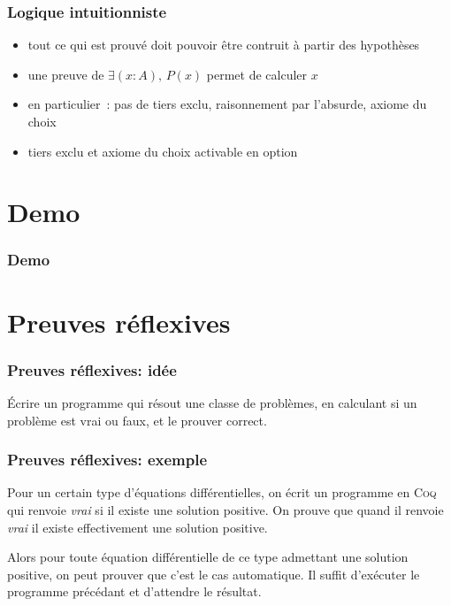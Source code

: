 \documentclass[hyperref={pdfpagelabels=false}]{beamer}
\begin{document}
\begin{frame}
  \frametitle{Logique intuitionniste}
  \begin{itemize}
    \item tout ce qui est prouvé doit pouvoir être contruit à partir des hypothèses
    \item une preuve de $\exists (x : A),\, P(x)$ permet de calculer $x$
    \item en particulier~: pas de tiers exclu, raisonnement par l'absurde, axiome du choix
    \item tiers exclu et axiome du choix activable en option
  \end{itemize}
\end{frame}

\section{Demo}
{
  \begin{frame}[plain]
    \frametitle{Demo}
  \end{frame}
}

\section{Preuves réflexives}
\begin{frame}
  \frametitle{Preuves réflexives: idée}
    Écrire un programme qui résout une classe de problèmes, en calculant si un problème est vrai ou faux, et le prouver correct.
\end{frame}
\begin{frame}
  \frametitle{Preuves réflexives: exemple}
  Pour un certain type d'équations différentielles, on écrit un programme en \textsc{Coq} qui renvoie \emph{vrai} si il existe une solution positive. On prouve que quand il renvoie \emph{vrai} il existe effectivement une solution positive.

  Alors pour toute équation différentielle de ce type admettant une solution positive, on peut prouver que c'est le cas automatique. Il suffit d'exécuter le programme précédant et d'attendre le résultat.
\end{frame}
\end{document}
